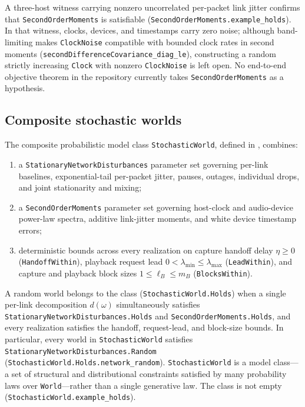 \documentclass[11pt,a4paper]{article}
\newcommand{\lean}[1]{\texttt{#1}}
\theoremstyle{definition}
\begin{document}
A three-host witness carrying nonzero uncorrelated per-packet link jitter
confirms that \lean{SecondOrderMoments} is satisfiable
(\lean{SecondOrderMoments.\allowbreak example\_\allowbreak holds}). In that witness,
clocks, devices, and timestamps carry zero noise; although band-limiting
makes \lean{ClockNoise} compatible with bounded clock rates in second
moments (\lean{secondDifferenceCovariance\_\allowbreak diag\_le}),
constructing a random strictly increasing \lean{Clock} with nonzero
\lean{ClockNoise} is left open. No end-to-end objective theorem in the
repository currently takes \lean{SecondOrderMoments} as a hypothesis.

\subsection{Composite stochastic worlds}

The composite probabilistic model class \lean{StochasticWorld}, defined in
, combines:
\begin{enumerate}
\item a \lean{StationaryNetworkDisturbances} parameter set governing
  per-link baselines, exponential-tail per-packet jitter, pauses, outages,
  individual drops, and joint stationarity and mixing;
\item a \lean{SecondOrderMoments} parameter set governing host-clock and
  audio-device power-law spectra, additive link-jitter moments, and white
  device timestamp errors;
\item deterministic bounds across every realization on capture handoff delay
  $\eta \ge 0$ (\lean{HandoffWithin}), playback request lead
  $0 < \lambda_{\min} \le \lambda_{\max}$ (\lean{LeadWithin}), and capture
  and playback block sizes $1 \le \ell_B \le m_B$ (\lean{BlocksWithin}).
\end{enumerate}
A random world belongs to the class (\lean{StochasticWorld.\allowbreak Holds})
when a single per-link decomposition $d(\omega)$ simultaneously satisfies
\lean{StationaryNetworkDisturbances.\allowbreak Holds} and
\lean{SecondOrderMoments.\allowbreak Holds}, and every realization satisfies
the handoff, request-lead, and block-size bounds. In particular, every world
in \lean{StochasticWorld} satisfies
\lean{StationaryNetworkDisturbances.\allowbreak Random}
(\lean{StochasticWorld.\allowbreak Holds.\allowbreak network\_\allowbreak random}).
\lean{StochasticWorld} is a model class---a set of structural and
distributional constraints satisfied by many probability laws over
\lean{World}---rather than a single generative law. The class is not empty
(\lean{StochasticWorld.\allowbreak example\_\allowbreak holds}).
\end{document}
